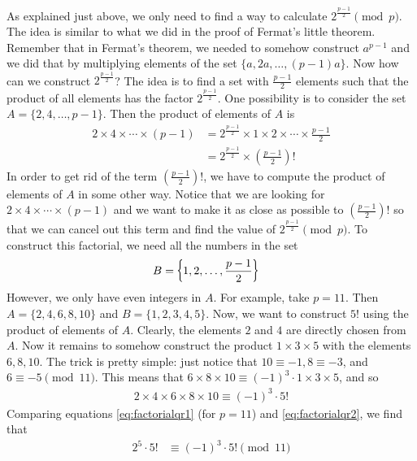 \documentclass[main.tex]{subfile}
\begin{document}
	\begin{solution}
		As explained just above, we only need to find a way to calculate $2^\frac{p-1}{2} \pmod p$. The idea is similar to what we did in the proof of Fermat's little theorem. Remember that in Fermat's theorem, we needed to somehow construct $a^{p-1}$ and we did that by multiplying elements of the set $\{a,2a,\ldots,(p-1)a\}$. Now how can we construct $2^\frac{p-1}{2}$? The idea is to find a set with  $\frac{p-1}{2}$ elements such that the product of all elements has the factor $2^\frac{p-1}{2}$. One possibility is to consider the set $A=\{2, 4, \ldots, p-1\}$. Then the product of elements of $A$ is
		\begin{align}\label{eq:factorialqr1}
			2 \times 4 \times \cdots \times (p-1) &= 2^\frac{p-1}{2} \times 1 \times 2 \times \cdots \times \frac{p-1}{2} \nonumber\\
			& = 2^\frac{p-1}{2} \times \left(\frac{p-1}{2}\right)!
		\end{align}
		In order to get rid of the term $ \left(\frac{p-1}{2}\right)!$, we have to compute the product of elements of $A$ in some other way. Notice that we are looking for $2 \times 4 \times \cdots \times (p-1)$ and we want to make it as close as possible to $ \left(\frac{p-1}{2}\right)!$ so that we can cancel out this term and find the value of $2^\frac{p-1}{2} \pmod p$. To construct this factorial, we need all the numbers in the set
			\begin{align*}
				B
					& = \curlybrace{1, 2, \ldots, \frac{p-1}{2}}
			\end{align*}
		However, we only have even integers in $A$. For example, take $p=11$. Then $A=\{2,4,6,8,10\}$ and $B=\{1,2,3,4,5\}$. Now, we want to construct $5!$ using the product of elements of $A$. Clearly, the elements $2$ and $4$ are directly chosen from $A$. Now it remains to somehow construct the product $1\times 3 \times 5$ with the elements $6,8,10$. The trick is pretty simple: just notice that $10 \equiv -1, 8 \equiv -3$, and $6 \equiv -5 \pmod{11}$. This means that $ 6 \times 8 \times 10 \equiv (-1)^3  \cdot 1 \times 3 \times 5$, and so
		\begin{align}\label{eq:factorialqr2}
		2 \times 4 \times 6 \times 8 \times 10 \equiv (-1)^3 \cdot 5!
		\end{align}
		Comparing equations \eqref{eq:factorialqr1} (for $p=11$) and \eqref{eq:factorialqr2}, we find that
		\begin{align*}
		2^5 \cdot 5!
			& \equiv (-1)^3 \cdot 5! \pmod{11}\\

\end{align*}
\end{solution}
\end{document}
